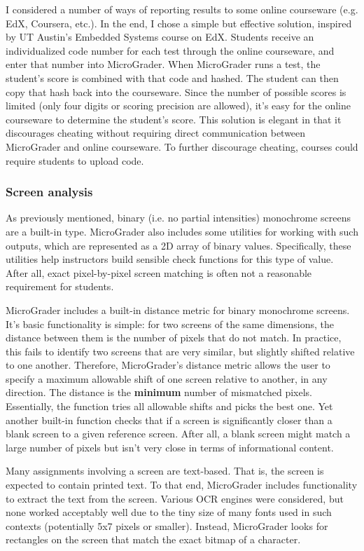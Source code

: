 \documentclass[12pt]{article}
\begin{document}
I considered a number of ways of reporting results to some online courseware (e.g. EdX, Coursera, etc.).  In the end, I chose a simple but effective solution, inspired by UT Austin's Embedded Systems course on EdX.  Students receive an individualized code number for each test through the online courseware, and enter that number into MicroGrader.  When MicroGrader runs a test, the student's score is combined with that code and hashed.  The student can then copy that hash back into the courseware.  Since the number of possible scores is limited (only four digits or scoring precision are allowed), it's easy for the online courseware to determine the student's score.  This solution is elegant in that it discourages cheating without requiring direct communication between MicroGrader and online courseware.  To further discourage cheating, courses could require students to upload code.

\subsubsection{Screen analysis}
As previously mentioned, binary (i.e. no partial intensities) monochrome screens are a built-in type.  MicroGrader also includes some utilities for working with such outputs, which are represented as a 2D array of binary values.  Specifically, these utilities help instructors build sensible check functions for this type of value.  After all, exact pixel-by-pixel screen matching is often not a reasonable requirement for students.

MicroGrader includes a built-in distance metric for binary monochrome screens.  It's basic functionality is simple: for two screens of the same dimensions, the distance between them is the number of pixels that do not match.  In practice, this fails to identify two screens that are very similar, but slightly shifted relative to one another.  Therefore, MicroGrader's distance metric allows the user to specify a maximum allowable shift of one screen relative to another, in any direction.  The distance is the \textbf{minimum} number of mismatched pixels.  Essentially, the function tries all allowable shifts and picks the best one.  Yet another built-in function checks that if a screen is significantly closer than a blank screen to a given reference screen.  After all, a blank screen might match a large number of pixels but isn't very close in terms of informational content.

Many assignments involving a screen are text-based.  That is, the screen is expected to contain printed text.  To that end, MicroGrader includes functionality to extract the text from the screen.  Various OCR engines were considered, but none worked acceptably well due to the tiny size of many fonts used in such contexts (potentially 5x7 pixels or smaller).  Instead, MicroGrader looks for rectangles on the screen that match the exact bitmap of a character.
\end{document}
